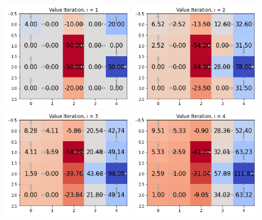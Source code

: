 \documentclass[submit]{harvardml}
\begin{document}
\begin{itemize}
    \begin{figure}[H]
        \centering
        {
            \includegraphics[width=0.48\textwidth]{hw6_2b_1}
            \includegraphics[width=0.48\textwidth]{hw6_2b_2}
        }\hfill
        {
            \includegraphics[width=0.48\textwidth]{hw6_2b_3}
            \includegraphics[width=0.48\textwidth]{hw6_2b_4}
        }
    \end{figure}
    

\end{itemize}
\end{document}
